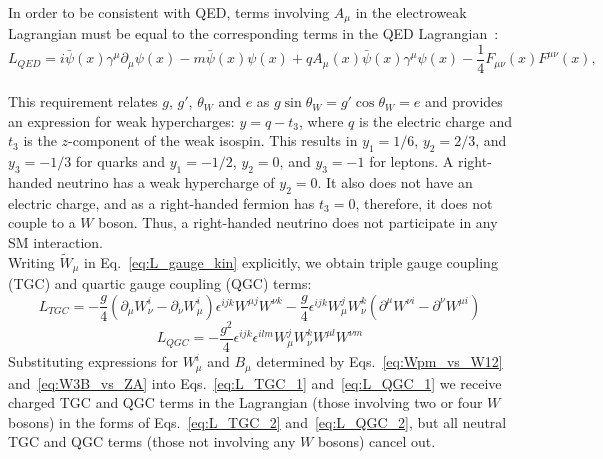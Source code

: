 \\
In order to be consistent with QED, terms involving $A_\mu$ in the electroweak Lagrangian must be equal to the corresponding terms in the QED Lagrangian~\cite{ref_Pich}:\\
\begin{equation}\label{eq:L_QED}
L_{QED} = i \bar{\psi}(x) \gamma^\mu \partial_\mu \psi(x) - m \bar{\psi}(x) \psi(x) + q A_\mu(x) \bar{\psi}(x) \gamma^\mu \psi(x) - \frac{1}{4} F_{\mu\nu}(x) F^{\mu\nu}(x),
\end{equation}
\\
This requirement relates $g$, $g'$, $\theta_W$ and $e$ as $g \sin \theta_W = g' \cos \theta_W = e$ and provides an expression for weak hypercharges: $y = q - t_3$, where $q$ is the electric charge and $t_3$ is the $z$-component of the weak isospin. This results in $y_1=1/6$, $y_2=2/3$, and $y_3=-1/3$ for quarks and $y_1=-1/2$, $y_2=0$, and $y_3=-1$ for leptons. A right-handed neutrino has a weak hypercharge of $y_2=0$. It also does not have an electric charge, and as a right-handed fermion has $t_3=0$, therefore, it does not couple to a $W$ boson. Thus, a right-handed neutrino does not participate in any SM interaction.\\
Writing $\tilde{W}_\mu$ in Eq.~\ref{eq:L_gauge_kin} explicitly, we obtain triple gauge coupling (TGC) and quartic gauge coupling (QGC) terms:\\ 
\begin{equation} \label{eq:L_TGC_1}
L_{TGC} = -\frac{g}{4}(\partial_\mu W_\nu^i - \partial_\nu W_\mu^i)\epsilon^{ijk}W^{\mu j}W^{\nu k} - \frac{g}{4}\epsilon^{ijk}W_\mu^j W_\nu^k (\partial^\mu W^{\nu i} - \partial^\nu W^{\mu i})
\end{equation}
\begin{equation} \label{eq:L_QGC_1}
L_{QGC} = -\frac{g^2}{4} \epsilon^{ijk} \epsilon^{ilm} W_\mu^j W_\nu^k W^{\mu l} W^{\nu m}
\end{equation}
Substituting expressions for $W_\mu^i$ and $B_\mu$ determined by Eqs.~\ref{eq:Wpm_vs_W12} and~\ref{eq:W3B_vs_ZA} into Eqs.~\ref{eq:L_TGC_1} and~\ref{eq:L_QGC_1} we receive charged TGC and QGC terms in the Lagrangian (those involving two or four $W$ bosons) in the forms of Eqs.~\ref{eq:L_TGC_2} and~\ref{eq:L_QGC_2}, but all neutral TGC and QGC terms (those not involving any $W$ bosons) cancel out.
